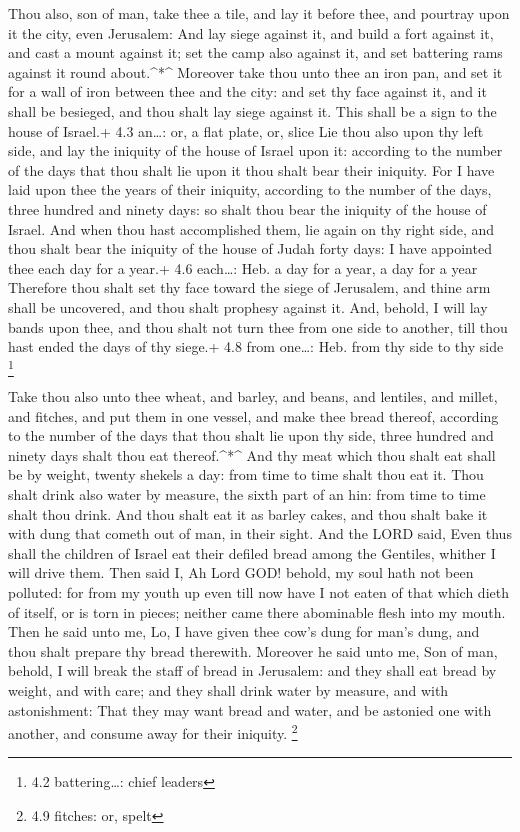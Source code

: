  Thou also, son of man, take thee a tile, and lay it before
thee, and pourtray upon it the city, even Jerusalem:  And
lay siege against it, and build a fort against it, and cast a mount
against it; set the camp also against it, and set battering rams against
it round about.\^{}*\^{}  Moreover take thou unto thee an
iron pan, and set it for a wall of iron between thee and the city: and
set thy face against it, and it shall be besieged, and thou shalt lay
siege against it. This shall be a sign to the house of Israel.+ 4.3
an\ldots: or, a flat plate, or, slice  Lie thou also upon
thy left side, and lay the iniquity of the house of Israel upon it:
according to the number of the days that thou shalt lie upon it thou
shalt bear their iniquity.  For I have laid upon thee the
years of their iniquity, according to the number of the days, three
hundred and ninety days: so shalt thou bear the iniquity of the house of
Israel.  And when thou hast accomplished them, lie again on
thy right side, and thou shalt bear the iniquity of the house of Judah
forty days: I have appointed thee each day for a year.+ 4.6 each\ldots:
Heb. a day for a year, a day for a year  Therefore thou
shalt set thy face toward the siege of Jerusalem, and thine arm shall be
uncovered, and thou shalt prophesy against it.  And, behold,
I will lay bands upon thee, and thou shalt not turn thee from one side
to another, till thou hast ended the days of thy siege.+ 4.8 from
one\ldots: Heb. from thy side to thy side \footnote{4.2 battering\ldots:
  chief leaders}

 Take thou also unto thee wheat, and barley, and beans, and
lentiles, and millet, and fitches, and put them in one vessel, and make
thee bread thereof, according to the number of the days that thou shalt
lie upon thy side, three hundred and ninety days shalt thou eat
thereof.\^{}*\^{}  And thy meat which thou shalt eat shall
be by weight, twenty shekels a day: from time to time shalt thou eat it.
 Thou shalt drink also water by measure, the sixth part of
an hin: from time to time shalt thou drink.  And thou shalt
eat it as barley cakes, and thou shalt bake it with dung that cometh out
of man, in their sight.  And the LORD said, Even thus shall
the children of Israel eat their defiled bread among the Gentiles,
whither I will drive them.  Then said I, Ah Lord GOD!
behold, my soul hath not been polluted: for from my youth up even till
now have I not eaten of that which dieth of itself, or is torn in
pieces; neither came there abominable flesh into my mouth. 
Then he said unto me, Lo, I have given thee cow's dung for man's dung,
and thou shalt prepare thy bread therewith.  Moreover he
said unto me, Son of man, behold, I will break the staff of bread in
Jerusalem: and they shall eat bread by weight, and with care; and they
shall drink water by measure, and with astonishment:  That
they may want bread and water, and be astonied one with another, and
consume away for their iniquity. \footnote{4.9 fitches: or, spelt}

